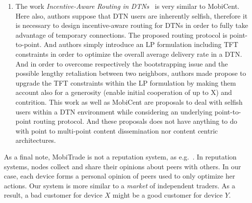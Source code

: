 \begin{enumerate}
\item The work \emph{Incentive-Aware Routing in DTNs}~\cite{IADTN} is very similar to MobiCent. Here also, authors suppose that DTN users are inherently selfish, therefore it is necessary to design incentive-aware routing for DTNs in order to fully take advantage of temporary connections. The proposed routing protocol is point-to-point. And authors simply introduce an LP formulation including TFT constraints in order to optimize the overall average delivery rate in a DTN. And in order to overcome respectively the bootstrapping issue and the possible lengthy retaliation between two neighbors, authors made propose to upgrade the TFT constraints within the LP formulation by making them account also for a generosity (enable initial cooperation of up to X) and contrition. This work as well as MobiCent are proposals to deal with selfish users within a DTN environment while considering an underlying point-to-point routing protocol. And these 
proposals does not have anything to do with point to multi-point content dissemination nor content centric architectures.

\end{enumerate}

As a final note, MobiTrade is not a reputation system, as e.g.~\cite{Reputation}. In reputation systems, nodes collect and share their opinions about peers with others. In our case, each device forms a personal opinion of peers used to only optimize her actions. Our system is more similar to a \emph{market} of independent traders. As a result, a bad customer for device $X$ might be a good customer for device $Y$.
